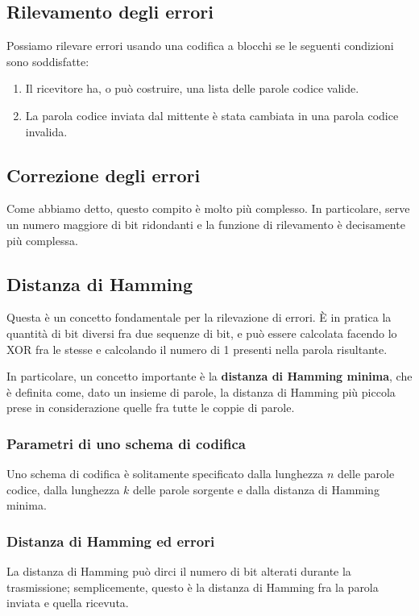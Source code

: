     \subsection{Rilevamento degli errori}
        Possiamo rilevare errori usando una codifica a blocchi se le seguenti condizioni sono soddisfatte:
        \begin{enumerate}
            \item Il ricevitore ha, o può costruire, una lista delle parole codice valide.
            
            \item La parola codice inviata dal mittente è stata cambiata in una parola codice invalida.
        \end{enumerate}
        
    \subsection{Correzione degli errori}
        Come abbiamo detto, questo compito è molto più complesso. In particolare, serve un numero maggiore di bit ridondanti e la funzione di rilevamento è decisamente più complessa.
        
    \subsection{Distanza di Hamming}
        Questa è un concetto fondamentale per la rilevazione di errori. È in pratica la quantità di bit diversi fra due sequenze di bit, e può essere calcolata facendo lo XOR fra le stesse e calcolando il numero di 1 presenti nella parola risultante.
        
        In particolare, un concetto importante è la \textbf{distanza di Hamming minima}, che è definita come, dato un insieme di parole, la distanza di Hamming più piccola prese in considerazione quelle fra tutte le coppie di parole.
        
        \subsubsection{Parametri di uno schema di codifica}
            Uno schema di codifica è solitamente specificato dalla lunghezza $n$ delle parole codice, dalla lunghezza $k$ delle parole sorgente e dalla distanza di Hamming minima.
            
        \subsubsection{Distanza di Hamming ed errori}
            La distanza di Hamming può dirci il numero di bit alterati durante la trasmissione; semplicemente, questo è la distanza di Hamming fra la parola inviata e quella ricevuta.
            
